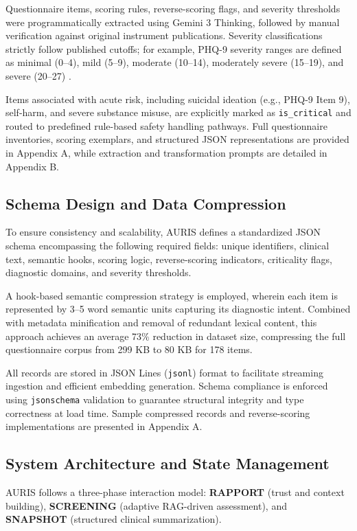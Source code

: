 \documentclass{svproc}
\begin{document}
Questionnaire items, scoring rules, reverse-scoring flags, and severity thresholds were programmatically extracted using Gemini 3 Thinking, followed by manual verification against original instrument publications. Severity classifications strictly follow published cutoffs; for example, PHQ-9 severity ranges are defined as minimal (0--4), mild (5--9), moderate (10--14), moderately severe (15--19), and severe (20--27) \cite{4}.

Items associated with acute risk, including suicidal ideation (e.g., PHQ-9 Item 9), self-harm, and severe substance misuse, are explicitly marked as \texttt{is\_critical} and routed to predefined rule-based safety handling pathways. Full questionnaire inventories, scoring exemplars, and structured JSON representations are provided in Appendix A, while extraction and transformation prompts are detailed in Appendix B.

\subsection{Schema Design and Data Compression}
To ensure consistency and scalability, AURIS defines a standardized JSON schema encompassing the following required fields: unique identifiers, clinical text, semantic hooks, scoring logic, reverse-scoring indicators, criticality flags, diagnostic domains, and severity thresholds.

A hook-based semantic compression strategy is employed, wherein each item is represented by 3--5 word semantic units capturing its diagnostic intent. Combined with metadata minification and removal of redundant lexical content, this approach achieves an average 73\% reduction in dataset size, compressing the full questionnaire corpus from 299 KB to 80 KB for 178 items.

All records are stored in JSON Lines (\texttt{jsonl}) format to facilitate streaming ingestion and efficient embedding generation. Schema compliance is enforced using \texttt{jsonschema} validation to guarantee structural integrity and type correctness at load time. Sample compressed records and reverse-scoring implementations are presented in Appendix A.

\subsection{System Architecture and State Management}
AURIS follows a three-phase interaction model: \textbf{RAPPORT} (trust and context building), \textbf{SCREENING} (adaptive RAG-driven assessment), and \textbf{SNAPSHOT} (structured clinical summarization).
\end{document}
